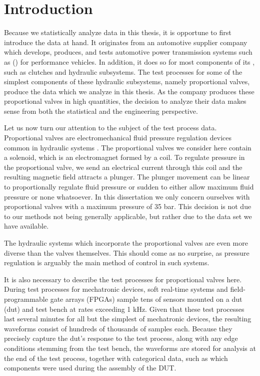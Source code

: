 \chapter{Introduction}

Because we statistically analyze data in this thesis, it is opportune to first introduce the data at hand.
It originates from an automotive supplier company which develops, produces, and tests automotive power transmission systems such as  () for performance vehicles.
In addition, it does so for most components of its , such as clutches and hydraulic subsystems.
The test processes for some of the simplest components of these hydraulic subsystems, namely proportional valves, produce the data which we analyze in this thesis.
As the company produces these proportional valves in high quantities, the decision to analyze their data makes sense from both the statistical and the engineering perspective.

Let us now turn our attention to the subject of the test process data.
Proportional valves are electromechanical fluid pressure regulation devices common in hydraulic systems \citep{DBLP:journals/tii/MazaevCH21}.
The proportional valves we consider here contain a solenoid, which is an electromagnet formed by a coil.
To regulate pressure in the proportional valve, we send an electrical current through this coil and the resulting magnetic field attracts a plunger.
The plunger movement can be linear to proportionally regulate fluid pressure or sudden to either allow maximum fluid pressure or none whatsoever.
In this dissertation we only concern ourselves with proportional valves with a maximum pressure of 35 bar.
This decision is not due to our methods not being generally applicable, but rather due to the data set we have available.


The hydraulic systems which incorporate the proportional valves are even more diverse than the valves themselves.
This should come as no surprise, as pressure regulation is arguably the main method of control in such systems.

It is also necessary to describe the test processes for proportional valves here.
During test processes for mechatronic devices, soft real-time systems and field-programmable gate arrays (FPGAs) sample tens of sensors mounted on a \acrlong{dut} (\acrshort{dut}) and test bench at rates exceeding 1 kHz.
Given that these test processes last several minutes for all but the simplest of mechatronic devices, the resulting waveforms consist of hundreds of thousands of samples each.
Because they precisely capture the \acrshort{dut}’s response to the test process, along with any edge conditions stemming from the test bench, the waveforms are stored for analysis at the end of the test process, together with categorical data, such as which components were used during the assembly of the DUT.\@

